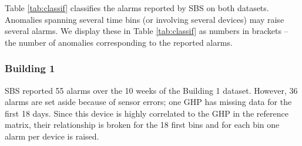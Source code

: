 Table \ref{tab:classif} classifies the alarms reported by SBS on both datasets.
 Anomalies spanning several time bins (or involving several devices) may raise several alarms.  We display these in Table \ref{tab:classif} 
 as numbers in brackets -- the number of anomalies corresponding to the reported alarms.

\subsubsection{Building 1}


SBS reported 55 alarms over the 10 weeks of the Building 1 dataset.
However, 36 alarms are set aside because of sensor errors; one GHP has missing data for the first 18 days.
Since this device is highly correlated to the GHP in the reference matrix, their relationship is broken for the 18 first bins and 
for each bin one alarm per device is raised.

